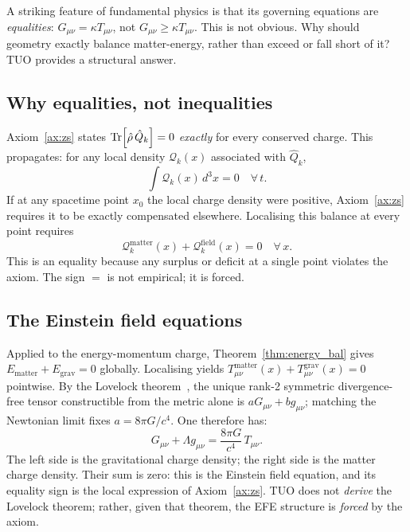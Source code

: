 \documentclass[12pt,a4paper]{article}
\theoremstyle{definition}
\theoremstyle{remark}
\newcommand{\rhohat}{\hat{\rho}}
\newcommand{\Qhat}{\hat{Q}}
\begin{document}
A striking feature of fundamental physics is that its governing equations
are \emph{equalities}: $G_{\mu\nu} = \kappa T_{\mu\nu}$, not $G_{\mu\nu}
\geq \kappa T_{\mu\nu}$. This is not obvious. Why should geometry exactly
balance matter-energy, rather than exceed or fall short of it? TUO provides
a structural answer.

\subsection{Why equalities, not inequalities}

Axiom~\ref{ax:zs} states $\Tr[\rhohat\,\Qhat_k] = 0$ \emph{exactly} for
every conserved charge.
This propagates: for any local density $\mathcal{Q}_k(x)$ associated with
$\Qhat_k$,
\begin{equation}
  \int \mathcal{Q}_k(x)\,d^3x = 0 \quad \forall\, t.
\end{equation}
If at any spacetime point $x_0$ the local charge density were positive,
Axiom~\ref{ax:zs} requires it to be exactly compensated elsewhere.
Localising this balance at every point requires
\begin{equation}
  \mathcal{Q}_k^\mathrm{matter}(x) + \mathcal{Q}_k^\mathrm{field}(x) = 0
  \quad \forall\, x.
\end{equation}
This is an equality because any surplus or deficit at a single point
violates the axiom. The sign $=$ is not empirical; it is forced.

\subsection{The Einstein field equations}

Applied to the energy-momentum charge, Theorem~\ref{thm:energy_bal} gives
$E_\mathrm{matter} + E_\mathrm{grav} = 0$ globally. Localising yields
$T_{\mu\nu}^\mathrm{matter}(x) + T_{\mu\nu}^\mathrm{grav}(x) = 0$ pointwise.
By the Lovelock theorem~\cite{Lovelock1971}, the unique rank-2 symmetric
divergence-free tensor constructible from the metric alone is
$aG_{\mu\nu} + bg_{\mu\nu}$; matching the Newtonian limit fixes
$a = 8\pi G/c^4$. One therefore has:
\begin{equation}\label{eq:EFE_ZSC}
  G_{\mu\nu} + \Lambda g_{\mu\nu} = \frac{8\pi G}{c^4}\,T_{\mu\nu}.
\end{equation}
The left side is the gravitational charge density; the right side is the
matter charge density. Their sum is zero: this is the Einstein field
equation, and its equality sign is the local expression of Axiom~\ref{ax:zs}.
TUO does not \emph{derive} the Lovelock theorem; rather, given that theorem,
the EFE structure is \emph{forced} by the axiom.
\end{document}
